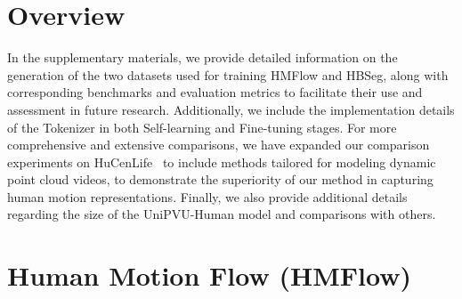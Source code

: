\clearpage
\setcounter{page}{1}
\begin{appendix}

\section{Overview}
In the supplementary materials, we provide detailed information on the generation of the two datasets used for training HMFlow and HBSeg, along with corresponding benchmarks and evaluation metrics to facilitate their use and assessment in future research. Additionally, we include the implementation details of the Tokenizer in both Self-learning and Fine-tuning stages. For more comprehensive and extensive comparisons, we have expanded our comparison experiments on HuCenLife~\cite{xu2023human} to include methods tailored for modeling dynamic point cloud videos, to demonstrate the superiority of our method in capturing human motion representations. Finally, we also provide additional details regarding the size of the UniPVU-Human model and comparisons with others.
\section{Human Motion Flow (HMFlow)}
\label{sec:hmflow}

\end{appendix}
